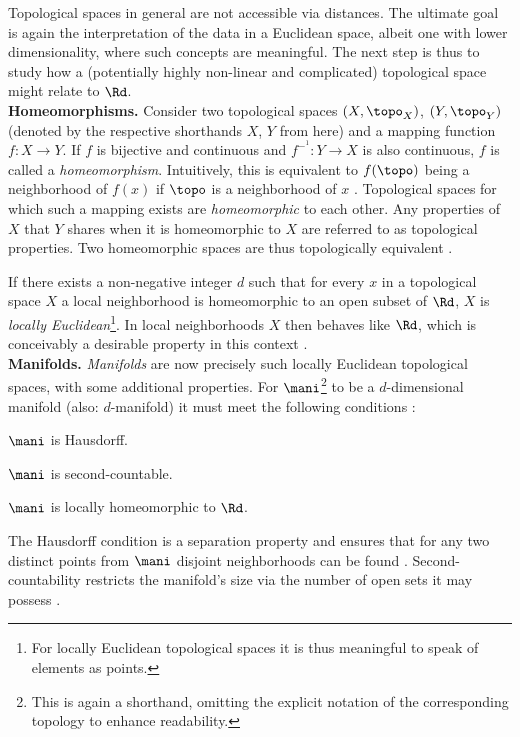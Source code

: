 Topological spaces in general are not accessible via distances.
The ultimate goal is again the interpretation of the data in a Euclidean space, 
albeit one with lower dimensionality, where such concepts are meaningful.
The next step is thus to study how a (potentially highly non-linear and
complicated) topological space might relate to $\Rd$.
\\

\textbf{Homeomorphisms.} Consider two topological spaces $(X, \topo_X)$, 
$(Y, \topo_Y)$ (denoted by the respective shorthands $X$, $Y$ from here) and a 
mapping function $f: X \rightarrow Y$. 
If $f$ is bijective and continuous and $f^{-^1}: Y \rightarrow X$ is also 
continuous, $f$ is called a \textit{homeomorphism}.
Intuitively, this is equivalent to $f(\topo)$ being a neighborhood of $f(x)$ if
$\topo$ is a neighborhood of $x$ \citep{brown2006}.
Topological spaces for which such a mapping exists are \textit{homeomorphic} to
each other. 
Any properties of $X$ that $Y$ shares when it is homeomorphic to $X$ are 
referred to as topological properties. 
Two homeomorphic spaces are thus topologically equivalent \citep{mccleary2006}.

If there exists a non-negative integer $d$ such that for every $x$ in a 
topological space $X$ a local neighborhood is homeomorphic to an open subset of 
$\Rd$, $X$ is \textit{locally Euclidean}\footnote{
For locally Euclidean topological spaces it is thus meaningful to speak of
elements as points.
}.
In local neighborhoods $X$ then behaves like $\Rd$, which is conceivably a 
desirable property in this context \citep{mafu2011}.
\\

\textbf{Manifolds.} \textit{Manifolds} are now precisely such locally Euclidean
topological spaces, with some additional properties.
For $\mani$\footnote{
This is again a shorthand, omitting the explicit notation of the corresponding
topology to enhance readability. 
} to be a $d$-dimensional manifold (also: $d$-manifold) it must meet 
the following conditions \citep{waldmann2014}:

\begin{tight_enumerate}
  \item $\mani$ is Hausdorff.
  \item $\mani$ is second-countable.
  \item $\mani$ is locally homeomorphic to $\Rd$.
\end{tight_enumerate}

The Hausdorff condition is a separation property and ensures that for any two 
distinct points from $\mani$ disjoint neighborhoods can be found 
\citep{brown2006}.
Second-countability restricts the manifold's size via the number of open sets 
it may possess \citep{waldmann2014}.

